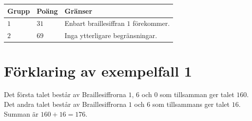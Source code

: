 \noindent
\begin{tabular}{| l | l | p{12cm} |}
  \hline
  \textbf{Grupp} & \textbf{Poäng} & \textbf{Gränser} \\ \hline
  $1$    & $31$      & Enbart braillesiffran $1$ förekommer. \\ \hline
  $2$    & $69$      & Inga ytterligare begränsningar. \\ \hline
\end{tabular}

\section*{Förklaring av exempelfall 1}
Det första talet består av Braillesiffrorna $1$, $6$ och $0$ som tillsamman ger talet $160$.
Det andra talet består av Braillesiffrorna $1$ och $6$ som tillsammans ger talet $16$.
Summan är $160+16=176$.
